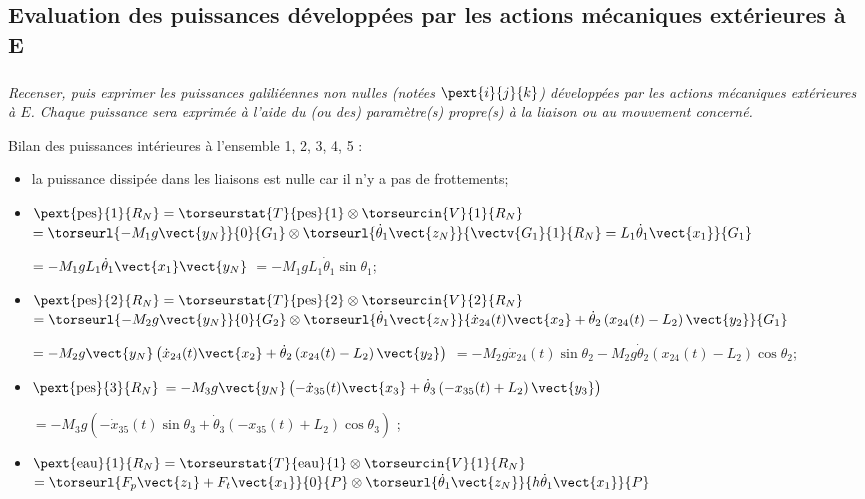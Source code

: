 \begin{multicols}{2}
\begin{corrige}
\end{corrige}
\else
\fi


\subsection*{Evaluation des puissances développées par les actions mécaniques extérieures à E}
\subparagraph{}\textit{Recenser, puis exprimer les puissances galiliéennes non nulles (notées $\pext{i}{j}{k}$) développées par les actions mécaniques extérieures à $E$. Chaque puissance sera exprimée à l’aide du (ou des)
paramètre(s) propre(s) à la liaison ou au mouvement concerné.}
\ifprof
\begin{corrige}
Bilan des puissances intérieures à l'ensemble 1, 2, 3, 4, 5 :
\begin{itemize}
\item la puissance dissipée dans les liaisons est nulle car il n'y a pas de frottements;
\item  $\pext{\text{pes}}{1}{R_N} = \torseurstat{T}{\text{pes}}{1}\otimes \torseurcin{V}{1}{R_N}$ 
$=\torseurl{-M_1g\vect{y_N}}{0}{G_1}\otimes \torseurl{\dot{\theta}_1\vect{z_N}}{\vectv{G_1}{1}{R_N}=L_1 \dot{\theta}_1\vect{x_1}}{G_1}$ 

 $=-M_1gL_1 \dot{\theta}_1\vect{x_1}\vect{y_N}$ $=-M_1gL_1 \dot{\theta}_1\sin \theta_1$;

\item  $\pext{\text{pes}}{2}{R_N} = \torseurstat{T}{\text{pes}}{2}\otimes \torseurcin{V}{2}{R_N}$ 
$=\torseurl{-M_2g\vect{y_N}}{0}{G_2}\otimes \torseurl{\dot{\theta}_1\vect{z_N}}{ \dot{x}_{24}(t)  \vect{x_2}+\dot{\theta}_2\left(  x_{24}(t)  -L_2 \right)\vect{y_2}}{G_1}$ 

 $= -M_2g\vect{y_N}\left(\dot{x}_{24}(t)  \vect{x_2}+\dot{\theta}_2\left(  x_{24}(t)  -L_2 \right)\vect{y_2}\right)$ $= -M_2g\dot{x}_{24}(t) \sin \theta_2-M_2g\dot{\theta}_2\left(  x_{24}(t)  -L_2 \right)\cos \theta_2$;

\item  $\pext{\text{pes}}{3}{R_N} $
 $= -M_3g\vect{y_N}\left(-\dot{x}_{35}(t)  \vect{x_3}+\dot{\theta}_3\left( - x_{35}(t)  +L_2 \right)\vect{y_3}\right)$
 
  $= -M_3g\left(-\dot{x}_{35}(t)  \sin\theta_3+\dot{\theta}_3\left( - x_{35}(t)  +L_2 \right)\cos\theta_3\right)$ ;
 
  
\item  $\pext{\text{eau}}{1}{R_N} = \torseurstat{T}{\text{eau}}{1}\otimes \torseurcin{V}{1}{R_N}$ 
$=\torseurl{F_p \vect{z_1}+F_t \vect{x_1}}{0}{P}\otimes \torseurl{\dot{\theta}_1\vect{z_N}}{h \dot{\theta}_1\vect{x_1}}{P}$ 


\end{itemize}
\end{corrige}
\end{multicols}
